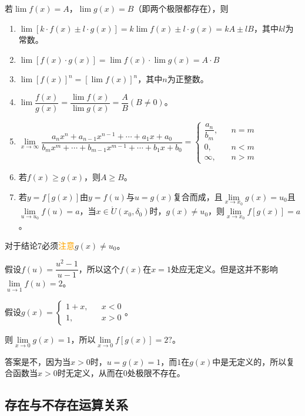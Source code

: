 \documentclass[UTF8, 12pt]{ctexart}
\begin{document}
    若$\lim f(x)=A$，$\lim g(x)=B$（即两个极限都存在），则

    \begin{enumerate}
        \item $\lim[k\cdot f(x)\pm l\cdot g(x)]=k\lim f(x)\pm l\cdot g(x)=kA\pm lB$，其中$kl$为常数。
        \item $\lim[f(x)\cdot g(x)]=\lim f(x)\cdot\lim g(x)=A\cdot B$
        \item $\lim[f(x)]^n=[\lim f(x)]^n$，其中$n$为正整数。
        \item $\lim\dfrac{f(x)}{g(x)}=\dfrac{\lim f(x)}{\lim g(x)}=\dfrac{A}{B}(B\neq 0)$。
        \item $\lim\limits_{x\to\infty}\dfrac{a_nx^n+a_{n-1}x^{n-1}+\cdots+a_1x+a_0}{b_mx^m+\cdots+b_{m-1}x^{m-1}+\cdots+b_1x+b_0}=\left\{
        \begin{array}{lcl}
            \dfrac{a_n}{b_m}, & & n=m \\
            0,                & & n<m \\
            \infty,           & & n>m
        \end{array}
        \right.$
        \item 若$f(x)\geqslant g(x)$，则$A\geqslant B$。
        \item 若$y=f[g(x)]$由$y=f(u)$与$u=g(x)$复合而成，且$\lim\limits_{x\to x_0}g(x)=u_0$且$\lim\limits_{u\to u_0}f(u)=a$，当$x\in\mathring{U}(x_0,\delta_0)$时，$g(x)\neq u_0$，则$\lim\limits_{x\to x_0}f[g(x)]=a$。
    \end{enumerate}

    对于结论7必须\textcolor{orange}{注意}$g(x)\neq u_0$。

    假设$f(u)=\dfrac{u^2-1}{u-1}$，所以这个$f(x)$在$x=1$处应无定义。但是这并不影响$\lim\limits_{u\to 1}f(u)=2$。

    假设$g(x)=\left\{
    \begin{array}{lcl}
        1+x, & & x<0 \\
        1,   & & x>0
    \end{array}
    \right.$。

    则$\lim\limits_{x\to 0}g(x)=1$，所以$\lim\limits_{x\to 0}f[g(x)]=2?$。

    答案是不，因为当$x>0$时，$u=g(x)=1$，而$1$在$g(x)$中是无定义的，所以复合函数当$x>0$时无定义，从而在$0$处极限不存在。

    \subsection{存在与不存在运算关系}
\end{document}
